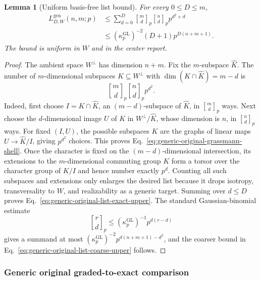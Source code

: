\documentclass[11pt]{article}
\newcommand{\1}{\mathbf 1}
\theoremstyle{plain}
\newtheorem{lemma}[theorem]{Lemma}
\theoremstyle{definition}
\theoremstyle{remark}
\begin{document}
\begin{lemma}[Uniform basis-free list bound]
\label{lem:generic-original-list-count}
For every $0\le D\le m$,
\begin{align}
 L_{D,W}^{\mathrm{gen}}(n,m;p)
 &\le\sum_{d=0}^{D}
 \genfrac{[}{]}{0pt}{}{m}{d}_p
 \genfrac{[}{]}{0pt}{}{n}{d}_p p^{d^2+d}
 \label{eq:generic-original-list-exact-upper}\\
 &\le (\kappa_p^{\mathrm{GL}})^{-2}(D+1)
 p^{D(n+m+1)}.
 \label{eq:generic-original-list-coarse-upper}
\end{align}
The bound is uniform in $W$ and in the center report.
\end{lemma}
\begin{proof}
The ambient space $W^\perp$ has dimension $n+m$.  Fix the $m$-subspace
$\widehat K$.  The number of $m$-dimensional subspaces $K\subseteq W^\perp$
with $\dim(K\cap\widehat K)=m-d$ is
\begin{equation}
 \genfrac{[}{]}{0pt}{}{m}{d}_p
 \genfrac{[}{]}{0pt}{}{n}{d}_p p^{d^2}.
 \label{eq:generic-original-grassmann-shell}
\end{equation}
Indeed, first choose $I=K\cap\widehat K$, an $(m-d)$-subspace of
$\widehat K$, in $\genfrac{[}{]}{0pt}{}{m}{d}_p$ ways.  Next choose the
$d$-dimensional image $U$ of $K$ in $W^\perp/\widehat K$, whose dimension is
$n$, in $\genfrac{[}{]}{0pt}{}{n}{d}_p$ ways.  For fixed $(I,U)$, the possible
subspaces $K$ are the graphs of linear maps
$U\to\widehat K/I$, giving $p^{d^2}$ choices.  This proves
Eq.~\eqref{eq:generic-original-grassmann-shell}.  Once the character is fixed
on the $(m-d)$-dimensional intersection, its extensions to the $m$-dimensional
commuting group $K$ form a torsor over the character group of $K/I$ and hence
number exactly $p^d$.  Counting all such subspaces and extensions only enlarges
the desired list because it drops isotropy, transversality to $W$, and
realizability as a generic target.
Summing over $d\le D$ proves Eq.~\eqref{eq:generic-original-list-exact-upper}.
The standard Gaussian-binomial estimate
\begin{equation}
 \genfrac{[}{]}{0pt}{}{r}{d}_p
 \le(\kappa_p^{\mathrm{GL}})^{-1}p^{d(r-d)}
 \label{eq:generic-original-gaussian-bound}
\end{equation}
gives a summand at most
$(\kappa_p^{\mathrm{GL}})^{-2}p^{d(n+m+1)-d^2}$, and the coarser bound in
Eq.~\eqref{eq:generic-original-list-coarse-upper} follows.
\end{proof}

\subsubsection{Generic original graded-to-exact comparison}
\label{subsubsec:generic-original-graded-to-exact}
\end{document}

